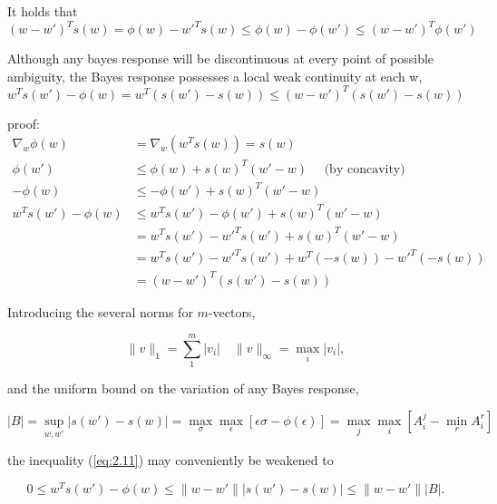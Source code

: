 \documentclass[11pt]{article}
\numberwithin{equation}{section}
\theoremstyle{boldStyle}
\begin{document}
It holds that 
\begin{equation} \label{eq:2.10}
    (w - w')^T s(w) = \phi(w) - w'^T s(w) \leq \phi(w) - \phi(w') \leq (w - w')^T \phi(w')
\end{equation}

Although any bayes response will be discontinuous at every point of possible ambiguity, the Bayes response possesses a local weak continuity at each w,
\begin{equation} \label{eq:2.11}
    w^T s(w') - \phi(w) = w^T (s(w') - s(w)) \leq (w - w')^T (s(w') - s(w)) 
\end{equation}

proof:
\begin{align*}
    \nabla_w \phi(w) &= \nabla_w (w^T s(w)) = s(w) \\
    \phi(w') &\leq \phi(w) + s(w)^T (w' - w) \quad \text{ (by concavity) } \\
    -\phi(w) &\leq -\phi(w') + s(w)^T (w' - w) \\
    w^T s(w') - \phi(w) &\leq w^T s(w') -\phi(w') + s(w)^T (w' - w) \\
    &= w^T s(w') - w'^T s(w') + s(w)^T (w' - w) \\
    &= w^T s(w') - w'^T s(w') + w^T (-s(w)) - w'^T (-s(w)) \\
    &= (w - w')^T (s(w') - s(w)) 
\end{align*}


Introducing the several norms for \( m \)-vectors,

\begin{equation} \label{eq:2.12}
\|v\|_1 = \sum_{1}^{m} |v_i| \quad \|v\|_\infty = \max_{i} |v_i|,
\end{equation}

and the uniform bound on the variation of any Bayes response,

\begin{equation} \label{eq:2.13}
|B| = \sup_{w, w'} |s(w') - s(w)| = \max_{\sigma} \max_{\epsilon} [\epsilon \sigma - \phi (\epsilon)] = \max_{j} \max_{i} [A^j_i - \min_{r}A^r_i]
\end{equation}

the inequality (\ref{eq:2.11}) may conveniently be weakened to

\begin{bluebox}
\begin{equation} \label{eq:2.14}
0 \leq w^T s(w') - \phi(w) \leq \|w - w'\| |s(w') - s(w)| \leq \|w - w'\| |B|.
\end{equation}
\end{bluebox}
\end{document}
